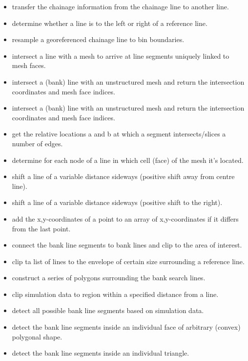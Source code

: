 \begin{itemize}
\item {} transfer the chainage information from the chainage line to another line.
\item {} determine whether a line is to the left or right of a reference line.
\item {} resample a georeferenced chainage line to bin boundaries.
\item {} intersect a line with a mesh to arrive at line segments uniquely linked to mesh faces.
\item {} intersect a (bank) line with an unstructured mesh and return the intersection coordinates and mesh face indices.
\item {} intersect a (bank) line with an unstructured mesh and return the intersection coordinates and mesh face indices.
\item {} get the relative locations a and b at which a segment intersects/slices a number of edges.
\item {} determine for each node of a line in which cell (face) of the mesh it's located.
\item {} shift a line of a variable distance sideways (positive shift away from centre line).
\item {} shift a line of a variable distance sideways (positive shift to the right).
\item {} add the x,y-coordinates of a point to an array of x,y-coordinates if it differs from the last point.
\item {} connect the bank line segments to bank lines and clip to the area of interest.
\item {} clip ta list of lines to the envelope of certain size surrounding a reference line.
\item {} construct a series of polygons surrounding the bank search lines.
\item {} clip simulation data to region within a specified distance from a line.
\item {} detect all possible bank line segments based on simulation data.
\item {} detect the bank line segments inside an individual face of arbitrary (convex) polygonal shape.
\item {} detect the bank line segments inside an individual triangle.
\end{itemize}


